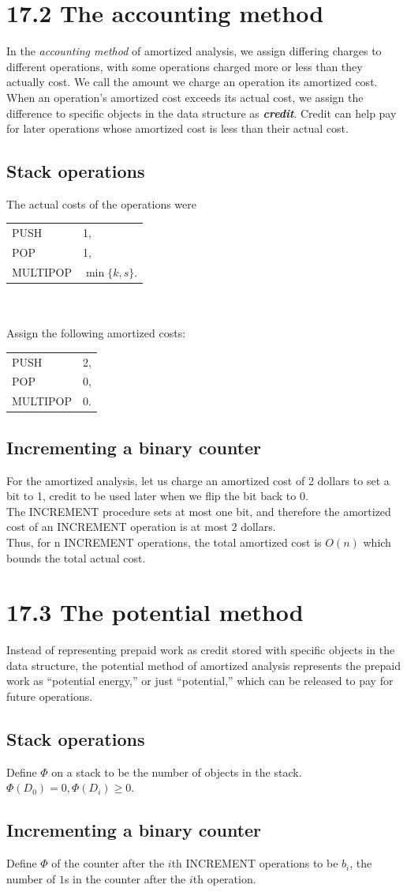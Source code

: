 \documentclass[a4paper]{article}
\begin{document}
\section*{17.2 The accounting method}
In the \textit{accounting method} of amortized analysis, we assign differing charges to different operations, with some operations charged more or less than they actually cost. We call the amount we charge an operation its amortized cost. When an operation’s amortized cost exceeds its actual cost, we assign the difference to specific objects in the data structure as \textit{\textbf{credit}}. Credit can help pay for later operations whose amortized cost is less than their actual cost.
\subsection*{Stack operations}
The actual costs of the operations were\\
\begin{tabular}{ll}
    PUSH &  1,\\
    POP & 1,\\
    MULTIPOP & $\min\{k,s\}$.
\end{tabular}\\
\\
Assign the following amortized costs:\\
\begin{tabular}{lc}
    PUSH &  2,\\
    POP & 0,\\
    MULTIPOP & 0.
\end{tabular}
\subsection*{Incrementing a binary counter}
For the amortized analysis, let us charge an amortized cost of 2 dollars to set a bit to 1, credit to be used later when we flip the bit back to 0.\\
The INCREMENT procedure sets at most one bit, and therefore the amortized cost of an INCREMENT operation is at most 2 dollars.\\
Thus, for n INCREMENT operations, the total amortized cost is $O(n)$
which bounds the total actual cost.
\section*{17.3 The potential method}
Instead of representing prepaid work as credit stored with specific objects in the data structure, the potential method of amortized analysis represents the prepaid work as “potential energy,” or just “potential,” which can be released to pay for future operations.
\subsection*{Stack operations}
Define $\Phi$ on a stack to be the number of objects in the stack. $\Phi(D_0)=0, \Phi(D_i)\geq 0$.
\subsection*{Incrementing a binary counter}
Define $\Phi$ of the counter after the $i$th INCREMENT operations to be $b_i$, the number of $1$s in the counter after the $i$th operation.
\end{document}
